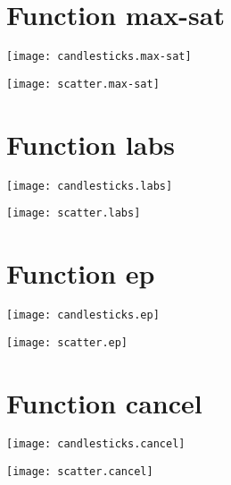 \section{Function max-sat}
\begin{center}

\end{center}
\begin{center}
\texttt{[image: candlesticks.max-sat]}
\end{center}
\begin{center}
\texttt{[image: scatter.max-sat]}
\end{center}
\begin{center}

\end{center}
\newpage
\section{Function labs}
\begin{center}

\end{center}
\begin{center}
\texttt{[image: candlesticks.labs]}
\end{center}
\begin{center}
\texttt{[image: scatter.labs]}
\end{center}
\begin{center}

\end{center}
\newpage
\section{Function ep}
\begin{center}

\end{center}
\begin{center}
\texttt{[image: candlesticks.ep]}
\end{center}
\begin{center}
\texttt{[image: scatter.ep]}
\end{center}
\begin{center}

\end{center}
\newpage
\section{Function cancel}
\begin{center}

\end{center}
\begin{center}
\texttt{[image: candlesticks.cancel]}
\end{center}
\begin{center}
\texttt{[image: scatter.cancel]}
\end{center}
\begin{center}

\end{center}
\newpage

